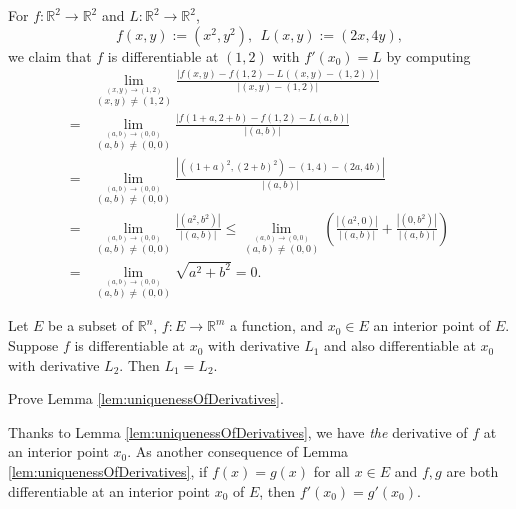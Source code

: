 \begin{exm}
  For $f: \mathbb{R}^2\rightarrow \mathbb{R}^2$
  and $L: \mathbb{R}^2\rightarrow \mathbb{R}^2$,
  \begin{equation}
    \label{eq:fSqaureComp}
    f(x,y):=(x^2, y^2), \ \ L(x,y):=(2x, 4y), 
  \end{equation}
  we claim that $f$ is differentiable at $(1,2)$
  with \mbox{$f'(x_0)=L$} by computing
  \begin{displaymath}
    \renewcommand{\arraystretch}{1.5}
    \begin{array}{rl}
    &\lim_{\stackrel{(x,y)\rightarrow (1,2)}{(x,y)\ne(1,2)}}
    \frac{|f(x,y)- f(1,2) - L((x,y)-(1,2))|}{|(x,y)-(1,2)|}
      \\
    =&\lim_{\stackrel{(a,b)\rightarrow (0,0)}{(a,b)\ne(0,0)}}
    \frac{|f(1+a,2+b)- f(1,2) - L(a,b)|}{|(a,b)|}
      \\
    =&\lim_{\stackrel{(a,b)\rightarrow (0,0)}{(a,b)\ne(0,0)}}
    \frac{|\left((1+a)^2,(2+b)^2\right)- (1,4) - (2a,4b)|}{|(a,b)|}
      \\
    =&\lim_{\stackrel{(a,b)\rightarrow (0,0)}{(a,b)\ne(0,0)}}
    \frac{|(a^2, b^2)|}{|(a,b)|}
    \le \lim_{\stackrel{(a,b)\rightarrow (0,0)}{(a,b)\ne(0,0)}}
          \left(\frac{|(a^2, 0)|}{|(a,b)|}
          +  \frac{|(0, b^2)|}{|(a,b)|}\right)
      \\
    = &\lim_{\stackrel{(a,b)\rightarrow (0,0)}{(a,b)\ne(0,0)}}
        \sqrt{a^2 + b^2}
    = 0.
    \end{array}
  \end{displaymath}
\end{exm}

\begin{lem}
  \label{lem:uniquenessOfDerivatives}
  Let $E$ be a subset of $\mathbb{R}^n$,
  $f: E\rightarrow \mathbb{R}^m$ a function,
  and $x_0\in E$ an interior point of $E$.
  Suppose $f$ is differentiable at $x_0$ with derivative $L_1$
  and also differentiable at $x_0$ with derivative $L_2$.
  Then $L_1=L_2$.
\end{lem}

\begin{exc}
  Prove Lemma \ref{lem:uniquenessOfDerivatives}.
\end{exc}

\begin{rem}
  Thanks to Lemma \ref{lem:uniquenessOfDerivatives},
  we have \emph{the} derivative of $f$ at an interior point $x_0$.
  As another consequence of Lemma \ref{lem:uniquenessOfDerivatives},
  if $f(x)=g(x)$ for all $x\in E$
  and $f,g$ are both differentiable at an interior point $x_0$ of $E$,
  then $f'(x_0)=g'(x_0)$.
\end{rem}

